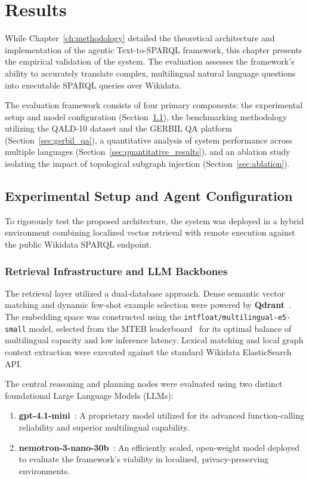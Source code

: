 \newpage

\section{Results}
\label{ch:evaluation}

While Chapter~\ref{ch:methodology} detailed the theoretical architecture and implementation of the agentic Text-to-SPARQL framework, this chapter presents the empirical validation of the system. The evaluation assesses the framework's ability to accurately translate complex, multilingual natural language questions into executable SPARQL queries over Wikidata. 

The evaluation framework consists of four primary components: the experimental setup and model configuration (Section~\ref{sec:experimental_setup}), the benchmarking methodology utilizing the QALD-10 dataset and the GERBIL QA platform (Section~\ref{sec:gerbil_qa}), a quantitative analysis of system performance across multiple languages (Section~\ref{sec:quantitative_results}), and an ablation study isolating the impact of topological subgraph injection (Section~\ref{sec:ablation}). 

\subsection{Experimental Setup and Agent Configuration}
\label{sec:experimental_setup}

To rigorously test the proposed architecture, the system was deployed in a hybrid environment combining localized vector retrieval with remote execution against the public Wikidata SPARQL endpoint.

\subsubsection{Retrieval Infrastructure and LLM Backbones}
The retrieval layer utilized a dual-database approach. Dense semantic vector matching and dynamic few-shot example selection were powered by \textbf{Qdrant}~\cite{qdrant2024}. The embedding space was constructed using the \texttt{intfloat/multilingual-e5-small} model, selected from the MTEB leaderboard~\cite{mteb2024leaderboard} for its optimal balance of multilingual capacity and low inference latency. Lexical matching and local graph context extraction were executed against the standard Wikidata ElasticSearch API.

The central reasoning and planning nodes were evaluated using two distinct foundational Large Language Models (LLMs):
\begin{enumerate}
    \item \textbf{gpt-4.1-mini}~\cite{openai2025gpt4mini}: A proprietary model utilized for its advanced function-calling reliability and superior multilingual capability.
    \item \textbf{nemotron-3-nano-30b}~\cite{nvidia2025nemotron}: An efficiently scaled, open-weight model deployed to evaluate the framework's viability in localized, privacy-preserving environments.
\end{enumerate}


